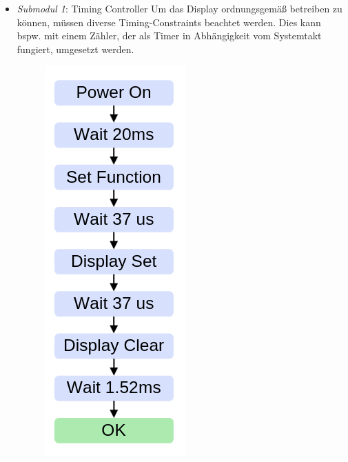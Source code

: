 \begin{itemize}
    \item \textit{Submodul 1}: Timing Controller \newline
    Um das Display ordnungsgemäß betreiben zu können, müssen diverse Timing-Constraints beachtet werden. Dies kann bspw. mit einem Zähler, der als Timer in Abhängigkeit vom Systemtakt fungiert, umgesetzt werden.\newline
    \begin{figure}[h!]
        \centering
        \begin{minipage}{0.15\textwidth}
            \includegraphics[width=\linewidth]{./images/lcd_timing.png} %

\end{minipage}
\end{figure}
\end{itemize}
